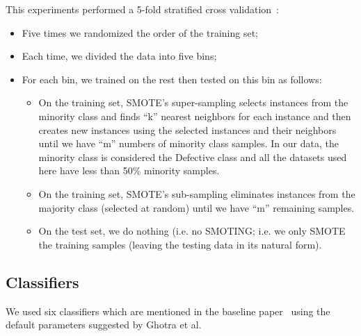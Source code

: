 \documentclass[sigconf]{acmart}
\newcommand{\bi}{\begin{itemize}[leftmargin=0.4cm]}
\newcommand{\ei}{\end{itemize}}
\theoremstyle{break}
\begin{document}
This experiments  performed a 5-fold stratified cross validation~\cite{refaeilzadeh2009cross}:
\bi
\item Five times we randomized the order of the training set;
\item Each time, we divided the data into five bins;
\item For each bin, we trained on the rest then tested
on this bin as follows:
\bi
\item
On the training set, SMOTE's super-sampling selects instances from the minority class and finds ``k'' nearest neighbors for each instance and then creates new instances using the selected instances and their neighbors until we have ``m'' numbers of minority class samples. 
In our data, 
 the minority class is considered the Defective class and all the datasets used here have less than 50\% minority samples.
\item
On the training set, SMOTE's sub-sampling  eliminates instances from the majority class (selected at random)
until we have ``m'' remaining samples.
 
\item On the test set, we do nothing (i.e. no SMOTING;
i.e. we only SMOTE the training samples
(leaving the  testing data in its natural form).
\ei
\ei

\subsection{\textbf{Classifiers}}
We used six classifiers which are mentioned in the baseline paper~\cite{ghotra2015revisiting}
using the default
parameters  suggested by Ghotra et al.
\end{document}
